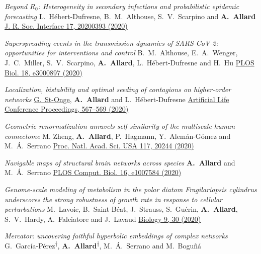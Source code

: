 \documentclass[11pt]{article}
\makeatletter
\newcommand{\reversearabic}[1]{\expandafter\@reversearabic\csname c@#1\endcsname}
\newcommand{\@reversearabic}[1]{%
  \number\numexpr\getrefnumber{this@etaremune@\romannumeral\c@etaremune}-#1+1\relax
}
\newcounter{etaremune}
\newenvironment{etaremune}[1][]{%
  \stepcounter{etaremune}%
  \begin{enumerate}[label=\reversearabic*.,#1]%
}{%
  \edef\@currentlabel{\the\csname c@\@enumctr\endcsname}%
  \label{this@etaremune@\romannumeral\c@etaremune}%
  \end{enumerate}%
}
\makeatother
\begin{document}
\begin{etaremune}[itemsep=0.5em, label={[A\reversearabic*]}]
%
  \item \parbox[t]{\textwidth-30pt}{\textit{Beyond $R_0$: Heterogeneity in secondary infections and probabilistic epidemic forecasting}\split
  L.~H\'ebert-Dufresne, B.~M.~Althouse, S.~V.~Scarpino and \textbf{A.~Allard}\split
  \href{https://doi.org/10.1098/rsif.2020.0393}{J. R. Soc. Interface 17, 20200393 (2020)}}
%
  \item \parbox[t]{\textwidth-30pt}{\textit{Superspreading events in the transmission dynamics of SARS-CoV-2: opportunities for interventions and control}\split
  B.~M.~Althouse, E.~A.~Wenger, J.~C.~Miller, S.~V.~Scarpino, \textbf{A.~Allard}, L.~H\'ebert-Dufresne and H.~Hu\split
  \href{https://doi.org/10.1371/journal.pbio.3000897}{PLOS Biol. 18, e3000897 (2020)}}
%
  \item \parbox[t]{\textwidth-30pt}{\textit{Localization, bistability and optimal seeding of contagions on higher-order networks}\split
  \uline{G.~St-Onge}, \textbf{A.~Allard} and L.~H\'ebert-Dufresne\split
  \href{https://doi.org/10.1162/isal_a_00327}{Artificial Life Conference Proceedings, 567--569 (2020)}}
%
  \item \parbox[t]{\textwidth-30pt}{\textit{Geometric renormalization unravels self-similarity of the multiscale human connectome}\split
  M. Zheng, \textbf{A.~Allard}, P.~Hagmann, Y.~Alem\'an-G\'omez and M.~\'A.~Serrano\split
  \href{http://doi.org/10.1073/pnas.1922248117}{Proc. Natl. Acad. Sci. USA 117, 20244 (2020)}}
%
  \item \parbox[t]{\textwidth-30pt}{\textit{Navigable maps of structural brain networks across species}\split
  \textbf{A.~Allard} and M.~\'A.~Serrano\split
  \href{https://doi.org/10.1371/journal.pcbi.1007584}{PLOS Comput. Biol. 16, e1007584 (2020)}}
%
  \item \parbox[t]{\textwidth-30pt}{\textit{Genome-scale modeling of metabolism in the polar diatom Fragilariopsis cylindrus underscores the strong robustness of growth rate in response to cellular perturbations}\split
  M.~Lavoie, B.~Saint-Béat, J.~Strauss, S.~Guérin, \textbf{A.~Allard}, S.~V.~Hardy, A.~Falciatore and J.~Lavaud\split
  \href{https://doi.org/10.3390/biology9020030}{Biology 9, 30 (2020)}}
%
  \item \parbox[t]{\textwidth-30pt}{\textit{Mercator: uncovering faithful hyperbolic embeddings of complex networks}\split
  G.~Garc\'ia-P\'erez\textsuperscript{$\dagger$}, \textbf{A.~Allard}\textsuperscript{$\dagger$}, M.~\'A.~Serrano and M.~Bogu\~n\'a\split
}
\end{etaremune}
\end{document}
